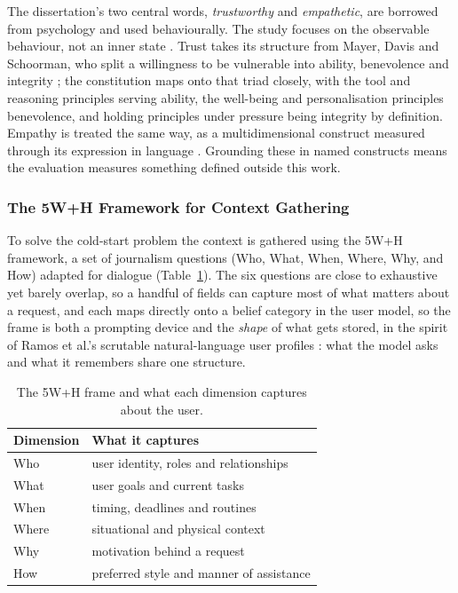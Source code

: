 The dissertation's two central words, \emph{trustworthy} and \emph{empathetic}, are borrowed from psychology and used behaviourally. The study focuses on the observable behaviour, not an inner state \cite{skinner1953sciencehumanbehavior}. Trust takes its structure from Mayer, Davis and Schoorman, who split a willingness to be vulnerable into ability, benevolence and integrity \cite{mayer1995integrativetrust}; the constitution maps onto that triad closely, with the tool and reasoning principles serving ability, the well-being and personalisation principles benevolence, and holding principles under pressure being integrity by definition. Empathy is treated the same way, as a multidimensional construct measured through its expression in language \cite{davis1983empathyiri, sharma2020computationalapproachunderstandingempathy}. Grounding these in named constructs means the evaluation measures something defined outside this work.

\subsubsection{The 5W+H Framework for Context Gathering}
\label{subsec:the-5w-h-framework-for-context-gathering}

To solve the cold-start problem the context is gathered using the 5W+H framework, a set of journalism questions (Who, What, When, Where, Why, and How) adapted for dialogue (Table~\ref{tab:5wh}). The six questions are close to exhaustive yet barely overlap, so a handful of fields can capture most of what matters about a request, and each maps directly onto a belief category in the user model, so the frame is both a prompting device and the \emph{shape} of what gets stored, in the spirit of Ramos et al.'s scrutable natural-language user profiles \cite{ramos2024transparentscrutablerecommendationsusing}: what the model asks and what it remembers share one structure.

\begin{table}[H]
  \centering
  \caption{The 5W+H frame and what each dimension captures about the user.}
  \label{tab:5wh}
  \begin{tabular}{ll}
    \hline
    Dimension & What it captures \\
    \hline
    Who & user identity, roles and relationships \\
    What & user goals and current tasks \\
    When & timing, deadlines and routines \\
    Where & situational and physical context \\
    Why & motivation behind a request \\
    How & preferred style and manner of assistance \\
    \hline
  \end{tabular}
\end{table}

